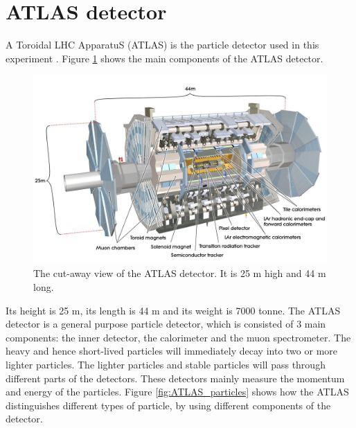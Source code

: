 \section{ATLAS detector}
\label{sec:detector_ATLAS}

A Toroidal LHC ApparatuS (ATLAS) is the particle detector used in this experiment \cite{ATLAS_doc}.
Figure \ref{fig:detector_ATLAS} shows the main components of the ATLAS detector.
\begin{figure}
\centering
\includegraphics[width=\textwidth]{data/photo/detector/ATLAS.jpg}
\caption{The cut-away view of the ATLAS detector. It is 25 m high and 44 m long. \cite{ATLAS_photo}}
\label{fig:detector_ATLAS}
\end{figure}
Its height is 25 m, its length is 44 m and its weight is 7000 tonne.
The ATLAS detector is a general purpose particle detector, which is consisted of 3 main components: the inner detector, the calorimeter and the muon spectrometer.
The heavy and hence short-lived particles will immediately decay into two or more lighter particles.
The lighter particles and stable particles will pass through different parts of the detectors.
These detectors mainly measure the momentum and energy of the particles.
Figure \ref{fig:ATLAS_particles} shows how the ATLAS distinguishes different types of particle, by using different components of the detector.
